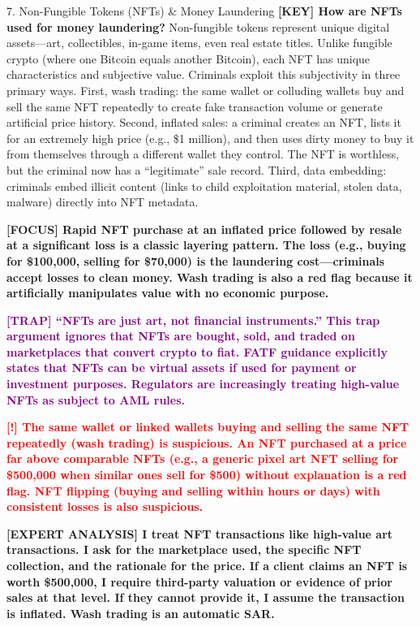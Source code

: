 \documentclass[11pt,a4paper]{beamer}
\newcommand{\redflag}[1]{\textcolor{red}{\textbf{[!] #1}}}
\newcommand{\examfocus}[1]{\textcolor{orange!80!black}{\textbf{[FOCUS] #1}}}
\newcommand{\trap}[1]{\textcolor{purple}{\textbf{[TRAP] #1}}}
\newcommand{\keyterm}[1]{\textcolor{red!80!black}{\textbf{[KEY] #1}}}
\newcommand{\expert}[1]{\textcolor{blue!70!black}{\textbf{[EXPERT ANALYSIS] #1}}}
\begin{document}
	\begin{frame}{7. Non-Fungible Tokens (NFTs) \& Money Laundering}
		\tiny
		\keyterm{How are NFTs used for money laundering?} Non-fungible tokens represent unique digital assets—art, collectibles, in-game items, even real estate titles. Unlike fungible crypto (where one Bitcoin equals another Bitcoin), each NFT has unique characteristics and subjective value. Criminals exploit this subjectivity in three primary ways. First, wash trading: the same wallet or colluding wallets buy and sell the same NFT repeatedly to create fake transaction volume or generate artificial price history. Second, inflated sales: a criminal creates an NFT, lists it for an extremely high price (e.g., \$1 million), and then uses dirty money to buy it from themselves through a different wallet they control. The NFT is worthless, but the criminal now has a “legitimate” sale record. Third, data embedding: criminals embed illicit content (links to child exploitation material, stolen data, malware) directly into NFT metadata.
		
		\vspace{0.1cm}
		\examfocus{Rapid NFT purchase at an inflated price followed by resale at a significant loss is a classic layering pattern. The loss (e.g., buying for \$100,000, selling for \$70,000) is the laundering cost—criminals accept losses to clean money. Wash trading is also a red flag because it artificially manipulates value with no economic purpose.}
		
		\vspace{0.1cm}
		\trap{“NFTs are just art, not financial instruments.” This trap argument ignores that NFTs are bought, sold, and traded on marketplaces that convert crypto to fiat. FATF guidance explicitly states that NFTs can be virtual assets if used for payment or investment purposes. Regulators are increasingly treating high-value NFTs as subject to AML rules.}
		
		\vspace{0.1cm}
		\redflag{The same wallet or linked wallets buying and selling the same NFT repeatedly (wash trading) is suspicious. An NFT purchased at a price far above comparable NFTs (e.g., a generic pixel art NFT selling for \$500,000 when similar ones sell for \$500) without explanation is a red flag. NFT flipping (buying and selling within hours or days) with consistent losses is also suspicious.}
		
		\vspace{0.1cm}
		\expert{I treat NFT transactions like high-value art transactions. I ask for the marketplace used, the specific NFT collection, and the rationale for the price. If a client claims an NFT is worth \$500,000, I require third-party valuation or evidence of prior sales at that level. If they cannot provide it, I assume the transaction is inflated. Wash trading is an automatic SAR.}
	\end{frame}
	
\end{document}
